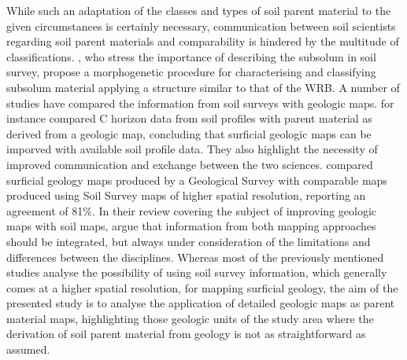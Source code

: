 \documentclass[preprint,12pt,authoryear]{elsarticle}
\begin{document}
While such an adaptation of the classes and types of soil parent material to the given circumstances is certainly necessary, communication between soil scientists regarding soil parent materials and comparability is hindered by the multitude of classifications. \cite{Juilleret2016}, who stress the importance of describing the subsolum in soil survey, propose a morphogenetic procedure for characterising and classifying subsolum material applying a structure similar to that of the WRB. 
A number of studies have compared the information from soil surveys with geologic maps. \cite{Juilleret2012} for instance compared  C horizon data from soil profiles with parent material as derived from a geologic map, concluding that surficial geologic maps can be imporved with available soil profile data. They also highlight the necessity of improved communication and exchange between the two sciences.  \cite{Miller2015a} compared surficial geology maps produced by a Geological Survey with comparable maps produced using Soil Survey maps of higher spatial resolution, reporting an agreement of 81\%. In their review covering the subject of improving geologic maps with soil maps, \cite{Brevik2015} argue that information from both mapping approaches should be integrated, but always under consideration of the limitations and differences between the disciplines. Whereas most of the previously mentioned studies analyse the possibility of using soil survey information, which generally comes at a higher spatial resolution, for mapping surficial geology, the aim of the presented study is to analyse the application of detailed geologic maps as parent material maps, highlighting those geologic units of the study area where the derivation of soil parent material from geology is not as straightforward as assumed.
\end{document}

